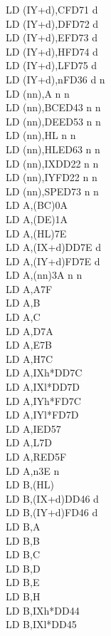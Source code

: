 \documentclass[oneside,a4paper]{book}
\begin{document}
\begin{multicols}{3}
{\begin{tabbing}
LD (IY+d),C\>FD71 d\\
LD (IY+d),D\>FD72 d\\
LD (IY+d),E\>FD73 d\\
LD (IY+d),H\>FD74 d\\
LD (IY+d),L\>FD75 d\\
LD (IY+d),n\>FD36 d n\\
LD (nn),A n n\\
LD (nn),BC\>ED43 n n\\
LD (nn),DE\>ED53 n n\\
LD (nn),HL n n\\
LD (nn),HL\>ED63 n n\\
LD (nn),IX\>DD22 n n\\
LD (nn),IY\>FD22 n n\\
LD (nn),SP\>ED73 n n\\
LD A,(BC)\>0A\\
LD A,(DE)\>1A\\
LD A,(HL)\>7E\\
LD A,(IX+d)\>DD7E d\\
LD A,(IY+d)\>FD7E d\\
LD A,(nn)\>3A n n\\
LD A,A\>7F\\
LD A,B\\
LD A,C\\
LD A,D\>7A\\
LD A,E\>7B\\
LD A,H\>7C\\
LD A,IXh*\>DD7C\\
LD A,IXl*\>DD7D\\
LD A,IYh*\>FD7C\\
LD A,IYl*\>FD7D\\
LD A,I\>ED57\\
LD A,L\>7D\\
LD A,R\>ED5F\\
LD A,n\>3E n\\
LD B,(HL)\\
LD B,(IX+d)\>DD46 d\\
LD B,(IY+d)\>FD46 d\\
LD B,A\\
LD B,B\\
LD B,C\\
LD B,D\\
LD B,E\\
LD B,H\\
LD B,IXh*\>DD44\\
LD B,IXl*\>DD45\\

\end{tabbing}}
\end{multicols}
\end{document}
